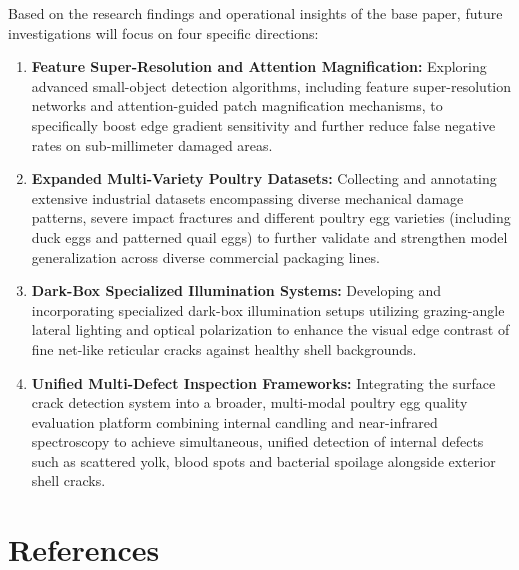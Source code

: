 \documentclass[12pt,a4paper]{report}
\begin{document}
Based on the research findings and operational insights of the base paper, future investigations will focus on four specific directions:
\begin{enumerate}[label=\arabic*.]
    \item \textbf{Feature Super-Resolution and Attention Magnification:} Exploring advanced small-object detection algorithms, including feature super-resolution networks and attention-guided patch magnification mechanisms, to specifically boost edge gradient sensitivity and further reduce false negative rates on sub-millimeter damaged areas.
    \item \textbf{Expanded Multi-Variety Poultry Datasets:} Collecting and annotating extensive industrial datasets encompassing diverse mechanical damage patterns, severe impact fractures and different poultry egg varieties (including duck eggs and patterned quail eggs) to further validate and strengthen model generalization across diverse commercial packaging lines.
    \item \textbf{Dark-Box Specialized Illumination Systems:} Developing and incorporating specialized dark-box illumination setups utilizing grazing-angle lateral lighting and optical polarization to enhance the visual edge contrast of fine net-like reticular cracks against healthy shell backgrounds.
    \item \textbf{Unified Multi-Defect Inspection Frameworks:} Integrating the surface crack detection system into a broader, multi-modal poultry egg quality evaluation platform combining internal candling and near-infrared spectroscopy to achieve simultaneous, unified detection of internal defects such as scattered yolk, blood spots and bacterial spoilage alongside exterior shell cracks.
\end{enumerate}


\chapter*{References}
\end{document}
